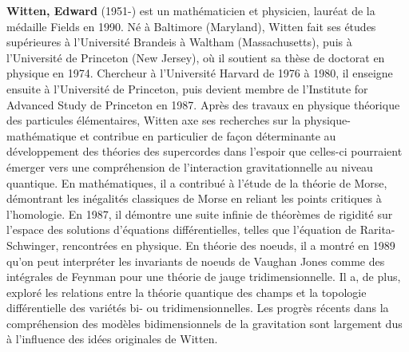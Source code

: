 \textbf{Witten, Edward} (1951-) est un mathématicien et physicien, lauréat de la médaille Fields en 1990. Né à Baltimore (Maryland), Witten fait ses études supérieures à l'Université Brandeis à Waltham (Massachusetts), puis à l'Université de Princeton (New Jersey), où il soutient sa thèse de doctorat en physique en 1974. Chercheur à l'Université Harvard de 1976 à 1980, il enseigne ensuite à l'Université de Princeton, puis devient membre de l'Institute for Advanced Study de Princeton en 1987. Après des travaux en physique théorique des particules élémentaires, Witten axe ses recherches sur la physique-mathématique et contribue en particulier de façon déterminante au développement des théories des supercordes dans l'espoir que celles-ci pourraient émerger vers une compréhension de l'interaction gravitationnelle au niveau quantique. En mathématiques, il a contribué à l'étude de la théorie de Morse, démontrant les inégalités classiques de Morse en reliant les points critiques à l'homologie. En 1987, il démontre une suite infinie de théorèmes de rigidité sur l'espace des solutions d'équations différentielles, telles que l'équation de Rarita-Schwinger, rencontrées en physique. En théorie des noeuds, il a montré en 1989 qu'on peut interpréter les invariants de noeuds de Vaughan Jones comme des intégrales de Feynman pour une théorie de jauge tridimensionnelle. Il a, de plus, exploré les relations entre la théorie quantique des champs et la topologie différentielle des variétés bi- ou tridimensionnelles. Les progrès récents dans la compréhension des modèles bidimensionnels de la gravitation sont largement dus à l'influence des idées originales de Witten.

{}
\label{sec:Y}

